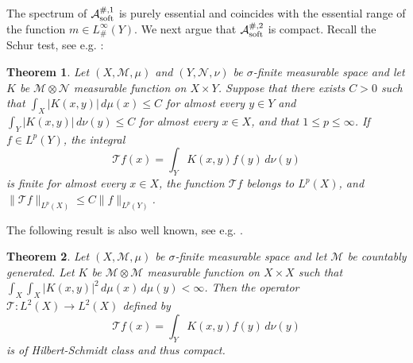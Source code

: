 \documentclass[11pt]{article}
\newcommand\soft{{\rm soft}}
\def\RR{\R}
\newcommand{\R}{\mathbf{R}}
\def\AA{\mathcal{A}}
\newtheorem{theorem}{Theorem}[section]
\theoremstyle{remark}
\begin{document}
 The spectrum of $\AA_\soft^{\#,1}$ is purely essential and coincides with the essential range of the function $m \in L^\infty_{\#}(Y)$. We next argue that $\AA_\soft^{\#,2}$ is compact. Recall the  Schur test, see e.g. \cite[Theorem 6.18]{Foll99}:  
 \begin{theorem} \label{thmfolland}
 	Let $(X,\mathcal{M},\mu)$ and $(Y,\mathcal{N},\nu)$ be $\sigma$-finite measurable space and let $K$ be $\mathcal{M} \otimes \mathcal{N}$ measurable function on $X \times Y$. Suppose that there exists $C>0$ such that $\int_X|K(x,y)|\,d\mu(x) \leq C$ for almost every $y \in Y$ and $\int_Y|K(x,y)|\,d\nu(y) \leq C$ for almost every $x \in X$, and that $1\leq p \leq \infty$. If $f \in L^p(Y)$, the integral
 	$$ \mathcal{T}f(x)=\int_Y K(x,y) f(y) \,d \nu(y)   $$
 	is finite for almost every $x \in X$, the function $\mathcal{T}f$ belongs to $L^p(X)$, and $\|\mathcal{T}f\|_{L^p(X)} \leq C\|f\|_{L^p(Y)}$.
 \end{theorem}
 The following result is also well known, see e.g. \cite{Halmos}.
 \begin{theorem} \label{propHS}
 	Let $(X,\mathcal{M},\mu)$  be $\sigma$-finite measurable space and let
 	$\mathcal{M}$  be countably generated. Let
 	$K$ be $\mathcal{M} \otimes \mathcal{M}$ measurable function on $X \times X$ such that $\int_X \int_X |K(x,y)|^2 \,d\mu(x)\,d\mu(y)< \infty$. Then the operator $\mathcal{T}:L^2(X)\to L^2(X)$ defined by
 	$$ \mathcal{T}f(x)=\int_Y K(x,y) f(y) \,d \nu(y)   $$
 	is of Hilbert-Schmidt class and thus compact.
 \end{theorem} 	
\end{document}
